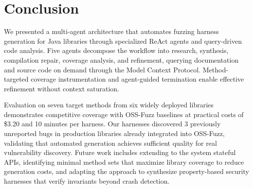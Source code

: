\documentclass[sigconf,review,anonymous]{acmart}
\begin{document}



\maketitle










\section{Conclusion}

We presented a multi-agent architecture that automates fuzzing harness generation for Java libraries through specialized ReAct agents and query-driven code analysis. Five agents decompose the workflow into research, synthesis, compilation repair, coverage analysis, and refinement, querying documentation and source code on demand through the Model Context Protocol. Method-targeted coverage instrumentation and agent-guided termination enable effective refinement without context saturation.

Evaluation on seven target methods from six widely deployed libraries demonstrates competitive coverage with OSS-Fuzz baselines at practical costs of \$3.20 and 10 minutes per harness. Our harnesses discovered 3 previously unreported bugs in production libraries already integrated into OSS-Fuzz, validating that automated generation achieves sufficient quality for real vulnerability discovery. Future work includes extending to the system stateful APIs, identifying minimal method sets that maximize library coverage to reduce generation costs, and adapting the approach to synthesize property-based security harnesses that verify invariants beyond crash detection.

%



\end{document}
